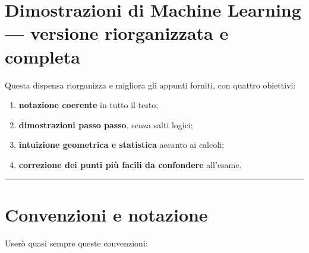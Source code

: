 \documentclass{article}
\title{}
\author{%
}
\providecommand{\tightlist}{%
  \setlength{\itemsep}{0pt}\setlength{\parskip}{0pt}}
\begin{document}
\maketitle


\begin{abstract}
    Add your abstract at the beginning of your markdown file like this 
  \begin{verbatim}
  --- 
  title: "Your Title" 
  abstract: "your abstract here"
  authors:
  - name: Leonardo V. Castorina
    affiliation: School of Informatics
    institution: University of Edinburgh
    email: justanemail@domain.ext
    address: Edinburgh
  - name: Coauthor
    affiliation: Affiliation
    institution: Institution
    email: coauthor@example.com
    address: Address
  ---
  \end{verbatim}
  This is called YAML frontmatter. If you set your abstract correctly you should not see this message.
  \end{abstract}


\section{Dimostrazioni di Machine Learning --- versione riorganizzata e
completa}\label{dimostrazioni-di-machine-learning-versione-riorganizzata-e-completa}

Questa dispensa riorganizza e migliora gli appunti forniti, con quattro
obiettivi:

\begin{enumerate}
\def\labelenumi{\arabic{enumi}.}
\tightlist
\item
  \textbf{notazione coerente} in tutto il testo;
\item
  \textbf{dimostrazioni passo passo}, senza salti logici;
\item
  \textbf{intuizione geometrica e statistica} accanto ai calcoli;
\item
  \textbf{correzione dei punti più facili da confondere} all'esame.
\end{enumerate}

\begin{center}\rule{0.5\linewidth}{0.5pt}\end{center}

\section{Convenzioni e notazione}\label{convenzioni-e-notazione}

Userò quasi sempre queste convenzioni:
\end{document}
